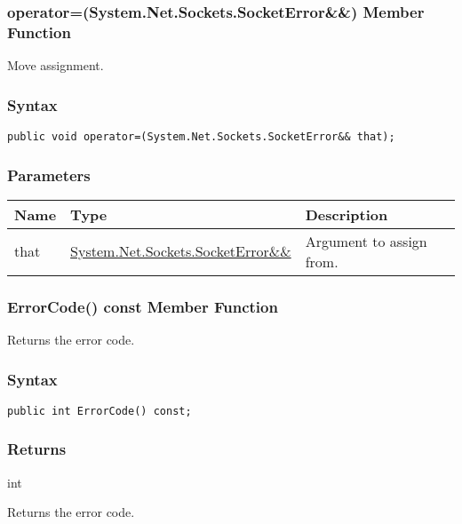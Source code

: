 \documentclass[a4paper,oneside,11.000000pt]{book}
\begin{document}
\hypertarget{System.Net.Sockets.SocketError.operator.assign.P.System.Net.Sockets.SocketError.RR.System.Net.Sockets.SocketError}{\subsubsection*{operator=(System.Net.Sockets.SocketError\&\&) Member Function}}\begin{flushleft}
Move assignment.

\end{flushleft}
\subsubsection*{Syntax}
\texttt{public void operator=(System.Net.Sockets.SocketError\&\& that);}
\subsubsection*{Parameters}
\begin{flushleft}
\begin{supertabular}[l]{!{\raggedright}p{1.30721cm}!{\raggedright}p{8.55945cm}!{\raggedright}p{4.93333cm}}
\textbf{Name}
& \textbf{Type}
& \textbf{Description}
\\
\hline
that
& \hyperlink{System.Net.Sockets.SocketError}{System.\-Net.\-Sockets.\-SocketError\&\-\&\-}
& Argument to assign from.

\\
\end{supertabular}

\end{flushleft}
\clearpage

\hypertarget{System.Net.Sockets.SocketError.ErrorCode.C.P.System.Net.Sockets.SocketError}{\subsubsection*{ErrorCode() const Member Function}}\begin{flushleft}
Returns the error code.

\end{flushleft}

\subsubsection*{Syntax}\texttt{public int ErrorCode() const;}
\subsubsection*{Returns}int
\begin{flushleft}
Returns the error code.

\end{flushleft}
\clearpage
\end{document}
